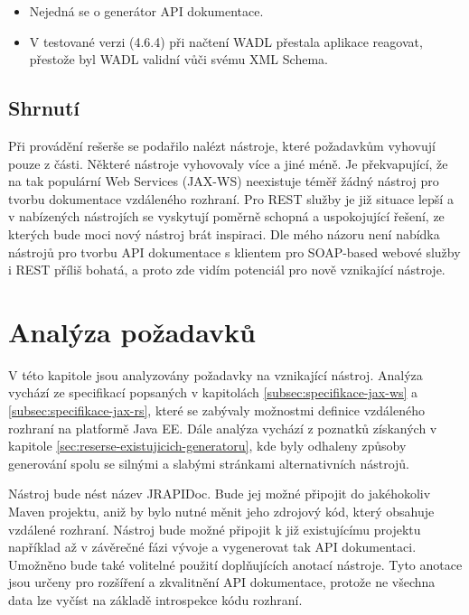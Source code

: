 \documentclass[11pt,twoside,a4paper]{book}
\begin{document}
\begin{itemize}
  \item Nejedná se o generátor API dokumentace.
  \item V testované verzi (4.6.4) při načtení WADL přestala aplikace  reagovat,
  přestože byl WADL validní vůči svému XML Schema.
\end{itemize}


\subsection{Shrnutí}

Při provádění rešerše se podařilo nalézt nástroje, které požadavkům vyhovují
pouze z části.
Některé nástroje vyhovovaly více a jiné méně. Je překvapující, že na tak
populární Web Services (JAX-WS) neexistuje téměř žádný nástroj pro tvorbu
dokumentace vzdáleného rozhraní. Pro REST služby je již situace lepší a v
nabízených nástrojích se vyskytují poměrně schopná a uspokojující řešení, ze
kterých bude moci nový nástroj brát inspiraci. Dle mého názoru není nabídka
nástrojů pro tvorbu API dokumentace s klientem pro SOAP-based webové služby i
REST příliš bohatá, a proto zde vidím potenciál pro nově vznikající nástroje.

\section{Analýza požadavků}
\label{sec:analyza-pozadavku}

V této kapitole jsou analyzovány požadavky na vznikající nástroj. Analýza vychází ze
specifikací popsaných v kapitolách \ref{subsec:specifikace-jax-ws} a
\ref{subsec:specifikace-jax-rs}, které se zabývaly možnostmi definice vzdáleného rozhraní na platformě Java EE. Dále analýza vychází z poznatků získaných v
kapitole \ref{sec:reserse-existujicich-generatoru}, kde byly odhaleny způsoby
generování spolu se silnými a slabými stránkami alternativních nástrojů.

Nástroj bude nést název JRAPIDoc. Bude jej možné připojit do jakéhokoliv Maven
projektu, aniž by bylo nutné měnit jeho zdrojový kód, který obsahuje vzdálené
rozhraní. Nástroj bude možné připojit k již existujícímu projektu například až v
závěrečné fázi vývoje a vygenerovat tak API dokumentaci. Umožněno bude také
volitelné použití doplňujících anotací nástroje. Tyto anotace jsou určeny pro
rozšíření a zkvalitnění API dokumentace, protože ne všechna data lze vyčíst
na základě introspekce kódu rozhraní.
\end{document}
